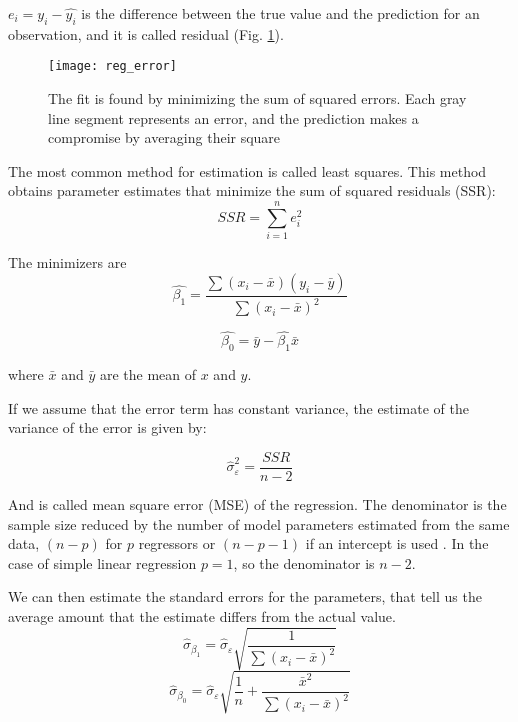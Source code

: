 $e_i = y_i - \widehat{y_i}$ is the difference between the true value and the prediction for an observation, and it is called residual (Fig. \ref{fig:reg_error}).

\begin{figure}[H]
	\centering
	\texttt{[image: reg\_error]}
	\caption{The fit is found by minimizing the sum of squared errors. Each gray line segment represents an error, and the prediction makes a compromise by averaging their square \cite{ISLR}}
	\label{fig:reg_error}
\end{figure}

The most common method for estimation is called least squares. This method obtains parameter estimates that minimize the sum of squared residuals (SSR):
\begin{equation}
SSR=\sum _{i=1}^{n}e_{i}^{2}
\end{equation}

The minimizers are
\begin{equation}
\widehat{\beta_{1}} = \frac{\sum(x_i - \bar{x})(y_i - \bar{y})}{\sum(x_i - \bar{x})^2}
\end{equation}

\begin{equation}
\widehat{\beta_{0}} = \bar{y} - \widehat{\beta_{1}} \bar {x}
\end{equation}

where $\bar{x}$ and $\bar{y}$ are the mean of $x$ and $y$.

If we assume that the error term has constant variance, the estimate of the variance of the error is given by:

\begin{equation}
\widehat{\sigma}_{\varepsilon }^{2} = \frac{SSR}{n-2}
\end{equation}

And is called mean square error (MSE) of the regression. The denominator is the sample size reduced by the number of model parameters estimated from the same data, $(n-p)$ for $p$ regressors or  $(n-p-1)$ if an intercept is used \cite{MSE}. In the case of simple linear regression $p=1$, so the denominator is $n-2$.

We can then estimate the standard errors for the parameters, that tell us the average amount that the estimate differs from the actual value.
\begin{equation}
{\widehat{\sigma}_{\beta _{1}} = {\widehat{\sigma}_{\varepsilon}{\sqrt{\frac{1}{\sum(x_{i} - {\bar {x}})^{2}}}}}}
\end{equation}
\begin{equation}
{\widehat{\sigma}_{\beta _{0}} = {\widehat{\sigma}_{\varepsilon}{\sqrt{\frac{1}{n} + \frac{\bar{x}^2}{\sum(x_{i} - {\bar {x}})^{2}}}}}}
\end{equation}

